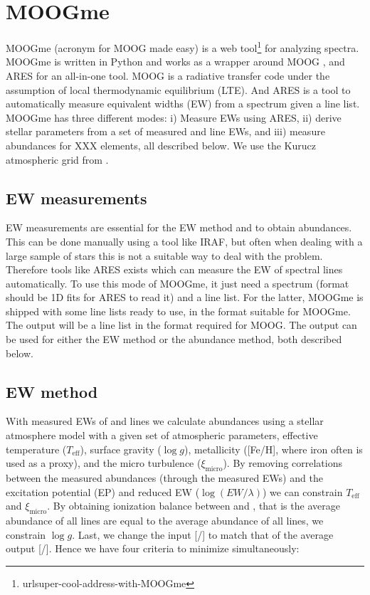 \documentclass{aa}
\begin{document}
\section{MOOGme}
\label{sec:MOOGme}
MOOGme (acronym for MOOG made easy) is a web tool\footnote{url{super-cool-address-with-MOOGme}}
for analyzing spectra. MOOGme is written in Python and works as a wrapper around MOOG
\citep{Sneden1973}, and ARES \citep{Sousa2015a} for an all-in-one tool.
MOOG is a radiative transfer code under the assumption of local
thermodynamic equilibrium (LTE). And ARES is a tool to automatically measure equivalent
widths (EW) from a spectrum given a line list. MOOGme has
three different modes: i) Measure EWs using ARES, ii) derive stellar parameters
from a set of measured  and  line EWs, and iii)
measure abundances for XXX elements, all described below. We use the Kurucz atmospheric grid from
\citet{Kurucz1993}.


\subsection{EW measurements}
\label{sub:EW_measurements}
EW measurements are essential for the EW method and to obtain abundances. This
can be done manually using a tool like IRAF, but often when dealing with a large
sample of stars this is not a suitable way to deal with the problem. Therefore
tools like ARES exists which can measure the EW of spectral lines automatically.
To use this mode of MOOGme, it just need a spectrum (format should be 1D fits
for ARES to read it) and a line
list. For the latter, MOOGme is shipped with some line lists ready to use, in
the format suitable for MOOGme. The output will be a line list in the format
required for MOOG. The output can be used for either the EW method or the
abundance method, both described below.



\subsection{EW method}
\label{sub:EW_method}
With measured EWs of  and  lines we calculate abundances using a
stellar atmosphere model with a given set of atmospheric parameters,
effective temperature ($T_\mathrm{eff}$), surface gravity ($\log g$),
metallicity ([Fe/H], where iron often is used as a proxy), and the micro
turbulence ($\xi_\mathrm{micro}$). By removing correlations between the measured
abundances (through the measured EWs) and the excitation potential (EP) and reduced
EW ($\log(EW/\lambda)$) we can constrain $T_\mathrm{eff}$ and $\xi_\mathrm{micro}$. By
obtaining ionization balance between  and , that is
the average abundance of all  lines are equal to the average
abundance of all  lines, we constrain $\log g$. Last, we change
the input [/] to match that of the average output
[/]. Hence we have four criteria to minimize simultaneously:
\end{document}
